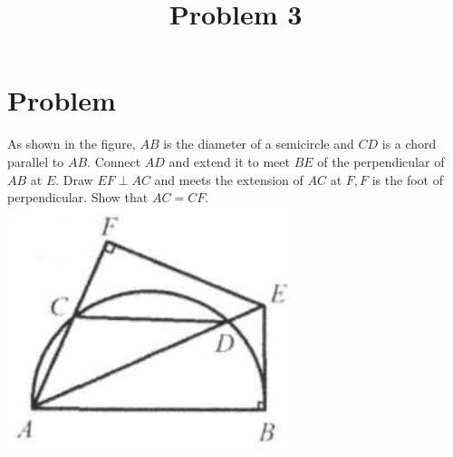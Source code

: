 \documentclass{article}
\title{Problem 3}
\date{}
\begin{document}
\maketitle

\section*{Problem}
As shown in the figure, \(A B\) is the diameter of a semicircle and \(C D\) is a chord parallel to \(A B\). Connect \(A D\) and extend it to meet \(B E\) of the perpendicular of \(A B\) at \(E\). Draw \(E F \perp A C\) and meets the extension of \(A C\) at \(F, F\) is the foot of perpendicular. Show that \(A C=C F\).\\
\centering
\includegraphics[width=\textwidth]{images/problem_image_1.jpg}
\end{document}
